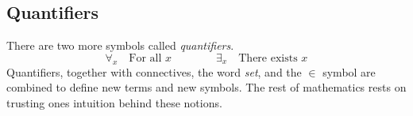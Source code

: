     \subsection{Quantifiers}
        There are two more symbols called
        \textit{\glspl{quantifier}}.
        \begin{equation*}
            \forall_{x}\quad\textrm{For all }x
            \quad\quad\quad\quad
            \exists_{x}\quad\textrm{There exists }x
        \end{equation*}
        Quantifiers, together with connectives, the word \textit{set}, and the
        $\in$ symbol are combined to define new terms and new symbols. The rest
        of mathematics rests on trusting ones intuition behind these notions.
